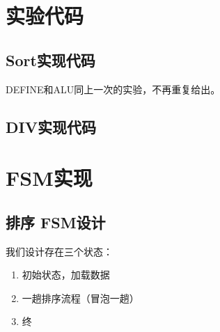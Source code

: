 \documentclass[12pt, a4paper]{article}
\begin{document}
\section{实验代码}
\subsection{Sort实现代码}
DEFINE和ALU同上一次的实验，不再重复给出。



\subsection{DIV实现代码}



\section{FSM实现}
\subsection{排序 FSM设计}
我们设计存在三个状态：
\begin{enumerate}
	\item 初始状态，加载数据
	\item 一趟排序流程（冒泡一趟）
	\item 终
\end{enumerate}
\end{document}
